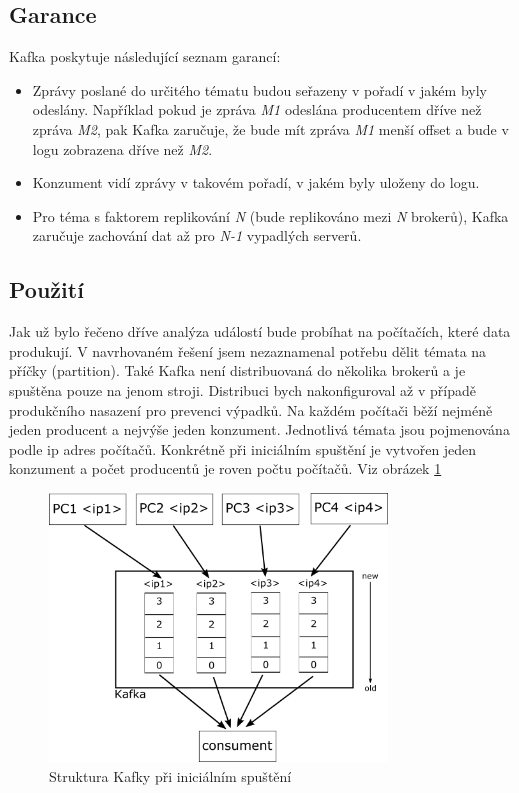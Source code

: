 \documentclass[
  digital, %
  table,   %
  nolof,     %
  nolot,     %
  twoside, %
  nocover,
  monochrome,
  12pt
]{fithesis3}
\begin{document}
\subsection*{Garance}
Kafka poskytuje následující seznam garancí:
\begin{itemize}
  \item Zprávy poslané do určitého tématu budou seřazeny v pořadí v jakém byly odeslány. Například pokud je zpráva \textit{M1} odeslána producentem dříve než zpráva \textit{M2}, pak Kafka zaručuje, že bude mít zpráva \textit{M1} menší offset a bude v logu zobrazena dříve než \textit{M2}.
  \item Konzument vidí zprávy v takovém pořadí, v jakém byly uloženy do logu.
  \item Pro téma s faktorem replikování \textit{N} (bude replikováno mezi \textit{N} brokerů), Kafka zaručuje zachování dat až pro \textit{N-1} vypadlých serverů.
\end{itemize}

\subsection*{Použití}
Jak už bylo řečeno dříve analýza událostí bude probíhat na počítačích, které data produkují. V navrhovaném řešení jsem nezaznamenal potřebu dělit témata na příčky (partition). Také Kafka není distribuovaná do několika brokerů a je spuštěna pouze na jenom stroji. Distribuci bych nakonfiguroval až v případě produkčního nasazení pro prevenci výpadků. Na každém počítači běží nejméně jeden producent a nejvýše jeden konzument. Jednotlivá témata jsou pojmenována podle ip adres počítačů. Konkrétně při iniciálním spuštění je vytvořen jeden konzument a počet producentů je roven počtu počítačů. Viz obrázek \ref{fig:kafka-impl}

\begin{figure}[H]
	\centering
    \includegraphics[width=0.8\textwidth, height=0.45\textheight]{images/kafka-impl.png}
    \caption{Struktura Kafky při iniciálním spuštění}
    \label{fig:kafka-impl}
\end{figure}
\end{document}
